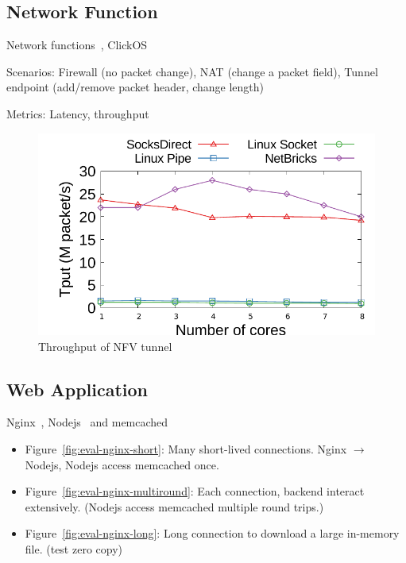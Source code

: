 \subsection{Network Function}

Network functions~\cite{li2016clicknp}, ClickOS~\cite{martins2014clickos}

Scenarios: Firewall (no packet change), NAT (change a packet field), Tunnel endpoint (add/remove packet header, change length)

Metrics: Latency, throughput

\begin{figure}[htpb]
	\centering
	\includegraphics[width=\columnwidth]{eval/microbenchmark/nfv-tun-tput.pdf}
	\caption{Throughput of NFV tunnel}
	\label{fig:eval-tun-tput}
\end{figure}



\subsection{Web Application}

Nginx~\cite{nginx}, Nodejs~\cite{nodejs} and memcached~\cite{memcached}

\begin{itemize}
	\item Figure~\ref{fig:eval-nginx-short}: Many short-lived connections. Nginx $\rightarrow$ Nodejs, Nodejs access memcached once.
	\item Figure~\ref{fig:eval-nginx-multiround}: Each connection, backend interact extensively. (Nodejs access memcached multiple round trips.)
	\item Figure~\ref{fig:eval-nginx-long}: Long connection to download a large in-memory file. (test zero copy)
\end{itemize}

